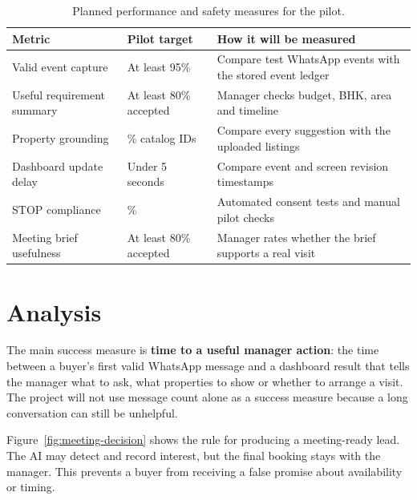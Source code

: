\documentclass{tietreport}
\begin{document}
\begin{table}[H]
\centering
\small
\begin{tabular}{>{\raggedright\arraybackslash}p{}
                >{\raggedright\arraybackslash}p{}
                >{\raggedright\arraybackslash}p{}}
\toprule
\textbf{Metric} & \textbf{Pilot target} & \textbf{How it will be measured} \\
\midrule
Valid event capture & At least 95\% & Compare test WhatsApp events with the stored event ledger \\
Useful requirement summary & At least 80\% accepted & Manager checks budget, BHK, area and timeline \\
Property grounding & 100\% catalog IDs & Compare every suggestion with the uploaded listings \\
Dashboard update delay & Under 5 seconds & Compare event and screen revision timestamps \\
STOP compliance & 100\% & Automated consent tests and manual pilot checks \\
Meeting brief usefulness & At least 80\% accepted & Manager rates whether the brief supports a real visit \\
\bottomrule
\end{tabular}
\caption{Planned performance and safety measures for the pilot.}
\label{tab:performance}
\end{table}

\section{Analysis}

The main success measure is \textbf{time to a useful manager action}: the time
between a buyer's first valid WhatsApp message and a dashboard result that tells
the manager what to ask, what properties to show or whether to arrange a visit.
The project will not use message count alone as a success measure because a long
conversation can still be unhelpful.

Figure~\ref{fig:meeting-decision} shows the rule for producing a meeting-ready
lead. The AI may detect and record interest, but the final booking stays with the
manager. This prevents a buyer from receiving a false promise about availability
or timing.
\end{document}
